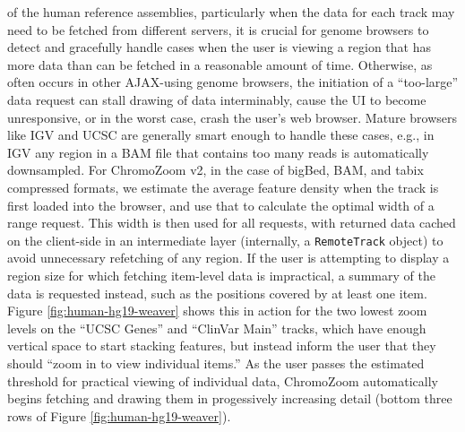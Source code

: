  of the human reference assemblies, particularly when the data for each track may need to be fetched from different servers, it is crucial for genome browsers to detect and gracefully handle cases when the user is viewing a region that has more data than can be fetched in a reasonable amount of time. Otherwise, as often occurs in other AJAX-using genome browsers, the initiation of a ``too-large'' data request can stall drawing of data interminably, cause the UI to become unresponsive, or in the worst case, crash the user's web browser. Mature browsers like IGV and UCSC are generally smart enough to handle these cases, e.g., in IGV any region in a BAM file that contains too many reads is automatically downsampled. For ChromoZoom v2, in the case of bigBed, BAM, and tabix compressed formats, we estimate the average feature density when the track is first loaded into the browser, and use that to calculate the optimal width of a range request. This width is then used for all requests, with returned data cached on the client-side in an intermediate layer (internally, a \texttt{RemoteTrack} object) to avoid unnecessary refetching of any region. If the user is attempting to display a region size for which fetching item-level data is impractical, a summary of the data is requested instead, such as the positions covered by at least one item. Figure \ref{fig:human-hg19-weaver} shows this in action for the two lowest zoom levels on the ``UCSC Genes'' and ``ClinVar Main'' tracks, which have enough vertical space to start stacking features, but instead inform the user that they should ``zoom in to view individual items.'' As the user passes the estimated threshold for practical viewing of individual data, ChromoZoom automatically begins fetching and drawing them in progessively increasing detail (bottom three rows of Figure \ref{fig:human-hg19-weaver}).

